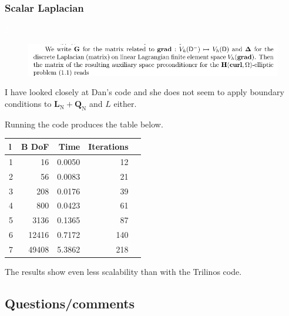 \documentclass{article}
\begin{document}
\subsubsection*{Scalar Laplacian}

\textcolor{white}{2}
\begin{figure}[h!]
    \centering
    \includegraphics[width=1\textwidth]{Figures/ScalarLaplacian.png}
    \caption{}
    \label{fig:121}
\end{figure}


I have looked closely at Dan's code and she does not seem to apply boundary conditions to $\textbf{L}_{\mbox{N}}+\textbf{Q}_{\mbox{N}}$ and $L$ either.



Running the code produces the table below.

\begin{tabular}{lrrrr}
\hline
  l &  B DoF &    Time &  Iterations \\
\hline
1 &     16 &  0.0050 &          12 \\
2 &     56 &  0.0083 &          21 \\
3 &    208 &  0.0176 &          39 \\
4 &    800 &  0.0423 &          61 \\
5 &   3136 &  0.1365 &          87 \\
6 &  12416 &  0.7172 &         140 \\
7 &  49408 &  5.3862 &         218 \\
\hline
\end{tabular}


The results show even less scalability than with the Trilinos code.

\subsection*{Questions/comments}
\end{document}
